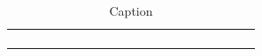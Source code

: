 
\begin{table}
    \centering
    \begin{tabular}{|>{\raggedright\arraybackslash}p{0.05\linewidth}|>{\raggedright\arraybackslash}p{0.05\linewidth}|>{\raggedright\arraybackslash}p{0.05\linewidth}|>{\raggedright\arraybackslash}p{0.05\linewidth}|>{\raggedright\arraybackslash}p{0.05\linewidth}|>{\raggedright\arraybackslash}p{0.05\linewidth}|>{\raggedright\arraybackslash}p{0.05\linewidth}|>{\raggedright\arraybackslash}p{0.05\linewidth}|>{\raggedright\arraybackslash}p{0.05\linewidth}|>{\raggedright\arraybackslash}p{0.05\linewidth}|>{\raggedright\arraybackslash}p{0.05\linewidth}|>{\raggedright\arraybackslash}p{0.05\linewidth}|>{\raggedright\arraybackslash}p{0.05\linewidth}|}\hline
         &  &  &  &  &  &  &  &  &  & & &\\\hline
         &  &  &  &  &  &  &  &  &  & & &\\\hline
         &  &  &  &  &  &  &  &  &  & & &\\\hline
         &  &  &  &  &  &  &  &  &  & & &\\\hline
         &  &  &  &  &  &  &  &  &  & & &\\ \hline
    \end{tabular}
    \caption{Caption}
    \label{tab:placeholder}
\end{table}